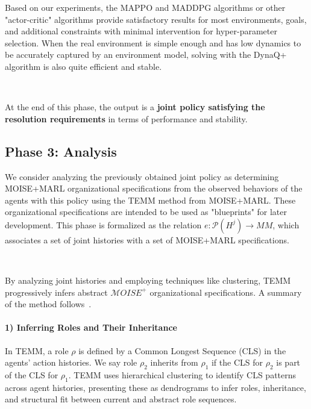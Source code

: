 \documentclass[pdflatex,sn-mathphys-num]{sn-jnl}%
\theoremstyle{thmstyleone}%
\theoremstyle{thmstyletwo}%
\theoremstyle{thmstylethree}%
\begin{document}
Based on our experiments, the MAPPO and MADDPG algorithms or other "actor-critic" algorithms provide satisfactory results for most environments, goals, and additional constraints with minimal intervention for hyper-parameter selection. When the real environment is simple enough and has low dynamics to be accurately captured by an environment model, solving with the DynaQ+ algorithm is also quite efficient and stable.

\

At the end of this phase, the output is a \textbf{joint policy satisfying the resolution requirements} in terms of performance and stability.

\subsection{Phase 3: Analysis}

We consider analyzing the previously obtained joint policy as determining MOISE+MARL organizational specifications from the observed behaviors of the agents with this policy using the TEMM method from MOISE+MARL. These organizational specifications are intended to be used as "blueprints" for later development. This phase is formalized as the relation $e: \mathcal{P}(H^{j}) \to MM$, which associates a set of joint histories with a set of MOISE+MARL specifications.

\

By analyzing joint histories and employing techniques like clustering, TEMM progressively infers abstract $\mathcal{M}OISE^+$ organizational specifications. A summary of the method follows~\hyperref[fn:github]{\footnotemark[1]}.
%

\paragraph{\textbf{1) Inferring Roles and Their Inheritance}}

In TEMM, a role $\rho$ is defined by a Common Longest Sequence (CLS) in the agents' action histories. We say role $\rho_2$ inherits from $\rho_1$ if the CLS for $\rho_2$ is part of the CLS for $\rho_1$. TEMM uses hierarchical clustering to identify CLS patterns across agent histories, presenting these as dendrograms to infer roles, inheritance, and structural fit between current and abstract role sequences.
\end{document}
